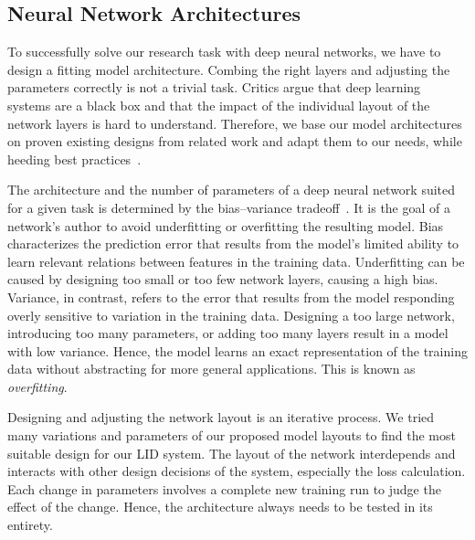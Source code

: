 \subsection{Neural Network Architectures}
\label{sec:cnn_architecture}
To successfully solve our research task with deep neural networks, we have to design a fitting model architecture. Combing the right layers and adjusting the parameters correctly is not a trivial task. Critics argue that deep learning systems are a black box and that the impact of the individual layout of the network layers is hard to understand. Therefore, we base our model architectures on proven existing designs from related work and adapt them to our needs, while heeding best practices~\cite{mishkin2016systematic, szegedy2016rethinking}.

The architecture and the number of parameters of a deep neural network suited for a given task is determined by the bias--variance tradeoff~\cite{geman1992neural}. It is the goal of a network's author to avoid underfitting or overfitting the resulting model. Bias characterizes the prediction error that results from the model's limited ability to learn relevant relations between features in the training data. Underfitting can be caused by designing too small or too few network layers, causing a high bias. Variance, in contrast, refers to the error that results from the model responding overly sensitive to variation in the training data. Designing a too large network, introducing too many parameters, or adding too many layers result in a model with low variance. Hence, the model learns an exact representation of the training data without abstracting for more general applications. This is known as \emph{overfitting}.

Designing and adjusting the network layout is an iterative process. We tried many variations and parameters of our proposed model layouts to find the most suitable design for our LID system. The layout of the network interdepends and interacts with other design decisions of the system, especially the loss calculation. Each change in parameters involves a complete new training run to judge the effect of the change. Hence, the architecture always needs to be tested in its entirety.

